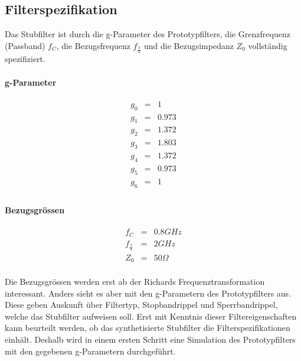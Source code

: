\subsection{Filterspezifikation}

Das  Stubfilter   ist   durch   die   g-Parameter   des  Prototypfilters,  die
Grenzfrequenz (Passband) $f_C$, die Bezugsfrequenz $f_{\frac{\lambda}{4}}$ und
die Bezugsimpedanz $Z_0$ vollständig spezifiziert.

\paragraph{g-Parameter}
\begin{mdframed}
\begin{equation*} 
\begin{array}{rclcl} 
g_0 & = & 1 \\ 
g_1 & = & 0.973 \\ 
g_2 & = & 1.372 \\ 
g_3 & = & 1.803 \\ 
g_4 & = & 1.372 \\ 
g_5 & = & 0.973 \\ 
g_6 & = & 1 \\ 
\end{array} 
\end{equation*} 
\end{mdframed}

\paragraph{Bezugsgrössen}

\begin{mdframed}
\begin{equation*} 
\begin{array}{rclcl} 
f_C & = & 0.8 GHz \\ 
f_{\frac{\lambda}{4}} & = & 2GHz \\ 
Z_0 & = & 50 \Omega \\ 
\end{array} 
\end{equation*} 
\end{mdframed}

Die  Bezugsgrössen  werden   erst   ab   der  Richards  Frequenztransformation
interessant. Anders sieht es aber  mit  den  g-Parametern  des Prototypfilters
aus.  Diese geben Auskunft über Filtertyp, Stopbandrippel und Sperrbandrippel,
welche   das   Stubfilter   aufweisen   soll.   Erst   mit   Kenntnis   dieser
Filtereigenschaften  kann  beurteilt  werden, ob das synthetisierte Stubfilter
die Filterspezifikationen  einhält.  Deshalb wird in einem ersten Schritt eine
Simulation des  Prototypfilters  mit  den gegebenen g-Parametern durchgeführt.


